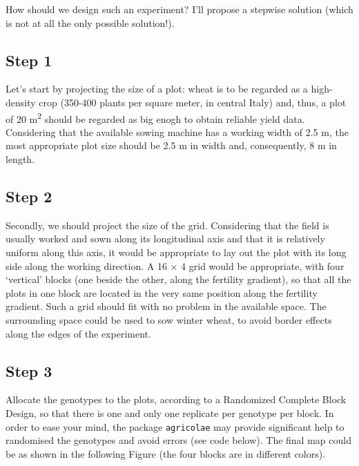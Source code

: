 \documentclass[
  letterpaper,
  DIV=11,
  numbers=noendperiod]{scrreprt}
\newenvironment{Shaded}{\begin{snugshade}}{\end{snugshade}}
\newcommand{\AttributeTok}[1]{\textcolor[rgb]{0.40,0.45,0.13}{#1}}
\newcommand{\DecValTok}[1]{\textcolor[rgb]{0.68,0.00,0.00}{#1}}
\newcommand{\FunctionTok}[1]{\textcolor[rgb]{0.28,0.35,0.67}{#1}}
\newcommand{\NormalTok}[1]{\textcolor[rgb]{0.00,0.23,0.31}{#1}}
\newcommand{\OtherTok}[1]{\textcolor[rgb]{0.00,0.23,0.31}{#1}}
\newcommand{\SpecialCharTok}[1]{\textcolor[rgb]{0.37,0.37,0.37}{#1}}
\begin{document}
How should we design such an experiment? I'll propose a stepwise
solution (which is not at all the only possible solution!).

\subsection{Step 1}\label{step-1}

Let's start by projecting the size of a plot: wheat is to be regarded as
a high-density crop (350-400 plants per square meter, in central Italy)
and, thus, a plot of 20 m\textsuperscript{2} should be regarded as big
enogh to obtain reliable yield data. Considering that the available
sowing machine has a working width of 2.5 m, the most appropriate plot
size should be 2.5 m in width and, consequently, 8 m in length.

\subsection{Step 2}\label{step-2}

Secondly, we should project the size of the grid. Considering that the
field is usually worked and sown along its longitudinal axis and that it
is relatively uniform along this axis, it would be appropriate to lay
out the plot with its long side along the working direction. A 16
\(\times\) 4 grid would be appropriate, with four `vertical' blocks (one
beside the other, along the fertility gradient), so that all the plots
in one block are located in the very same position along the fertility
gradient. Such a grid should fit with no problem in the available space.
The surrounding space could be used to sow winter wheat, to avoid border
effects along the edges of the experiment.

\subsection{Step 3}\label{step-3}

Allocate the genotypes to the plots, according to a Randomized Complete
Block Design, so that there is one and only one replicate per genotype
per block. In order to ease your mind, the package \texttt{agricolae}
may provide significant help to randomised the genotypes and avoid
errors (see code below). The final map could be as shown in the
following Figure (the four blocks are in different colors).

\begin{Shaded}
\end{Shaded}
\end{document}

